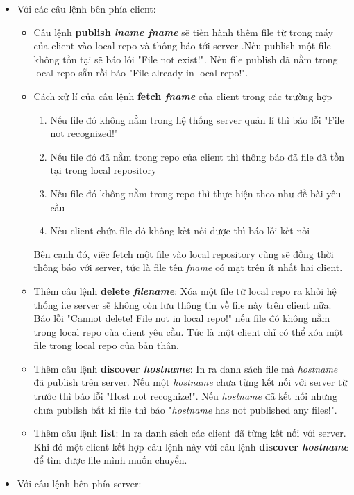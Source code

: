 \documentclass[a4paper]{article}
\begin{document}
	\begin{itemize}
		\item Với các câu lệnh bên phía client:
		\begin{itemize}
			\item Câu lệnh \textbf{publish \textit{lname fname}} sẽ tiến hành thêm file từ trong máy của client vào local repo và thông báo tới server .Nếu publish một file không tồn tại sẽ báo lỗi "File not exist!". Nếu file publish đã nằm trong local repo sẵn rồi báo "File already in local repo!".
			\item Cách xử lí của câu lệnh \textbf{fetch \textit{fname}} của client trong các trường hợp
			\begin{enumerate}
				\item Nếu file đó không nằm trong hệ thống server quản lí thì báo lỗi "File not recognized!"
				\item Nếu file đó đã nằm trong repo của client thì thông báo đã file đã tồn tại trong local repository
				\item Nếu file đó không nằm trong repo thì thực hiện theo như đề bài yêu cầu
				\item Nếu client chứa file đó không kết nối được thì báo lỗi kết nối 
			\end{enumerate}
			Bên cạnh đó, việc fetch một file vào local repository cũng sẽ đồng thời thông báo với server, tức là file tên \textit{fname} có mặt trên ít nhất hai client.
			\item Thêm câu lệnh \textbf{delete \textit{filename}}: Xóa một file từ local repo ra khỏi hệ thống i.e server sẽ không còn lưu thông tin về file này trên client nữa.
			Báo lỗi "Cannot delete! File not in local repo!" nếu file đó không nằm trong local repo của client yêu cầu. Tức là một client chỉ có thể xóa một file trong local repo của bản thân.
			\item Thêm câu lệnh \textbf{discover \textit{hostname}}: In ra danh sách file mà \textit{hostname} đã publish trên server. Nếu một \textit{hostname} chưa từng kết nối với server từ trước thì báo lỗi "Host not recognize!". Nếu \textit{hostname} đã kết nối nhưng chưa publish bất kì file thì báo "\textit{hostname} has not published any files!".
			\item Thêm câu lệnh \textbf{list}: In ra danh sách các client đã từng kết nối với server. Khi đó một client kết hợp câu lệnh này với câu lệnh \textbf{discover \textit{hostname}} để tìm được file mình muốn chuyển.
		\end{itemize}
		\item Với câu lệnh bên phía server:

\end{itemize}
\end{document}
